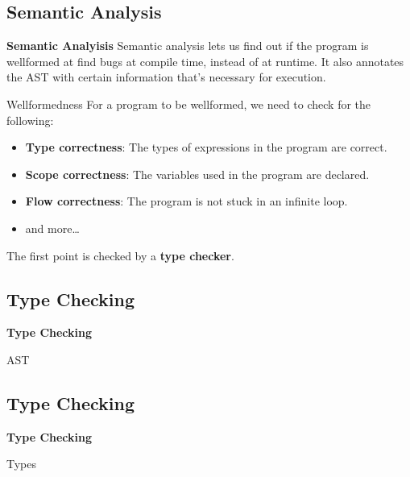 \subsection{Semantic Analysis}
\begin{frame}{\textbf{Semantic Analyisis}}
    Semantic analysis lets us find out if the program is wellformed at find bugs at compile time, instead of at runtime.
    It also annotates the AST with certain information that's necessary for execution.

    \begin{block}{Wellformedness}
        For a program to be wellformed, we need to check for the following:
        \begin{itemize}
            \item \textbf{Type correctness}: The types of expressions in the program are correct.
            \item \textbf{Scope correctness}: The variables used in the program are declared.
            \item \textbf{Flow correctness}: The program is not stuck in an infinite loop.
            \item and more\dots
        \end{itemize}
        The first point is checked by a \textbf{type checker}.
    \end{block}
\end{frame}

\subsection{Type Checking}
\begin{frame}[fragile]{\textbf{Type Checking}}
    
    \begin{example}
        AST
        
    \end{example}
\end{frame}
\subsection*{Type Checking}
\begin{frame}[fragile]{\textbf{Type Checking}}
    \begin{example}
        Types
        
    \end{example}
\end{frame}

